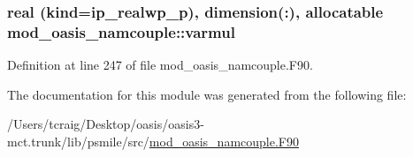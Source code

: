 \hypertarget{classmod__oasis__namcouple_ab7c38fd6bd90bb8e6ebfb539ead1f1a9}{
\subsubsection[{varmul}]{\setlength{\rightskip}{0pt plus 5cm}real (kind=ip\+\_\+realwp\+\_\+p), dimension(\+:), allocatable mod\+\_\+oasis\+\_\+namcouple\+::varmul\hspace{0.3cm}{\ttfamily [private]}}}\label{classmod__oasis__namcouple_ab7c38fd6bd90bb8e6ebfb539ead1f1a9}


Definition at line 247 of file mod\+\_\+oasis\+\_\+namcouple.\+F90.



The documentation for this module was generated from the following file\+:\begin{DoxyCompactItemize}
\item 
/\+Users/tcraig/\+Desktop/oasis/oasis3-\/mct.\+trunk/lib/psmile/src/\hyperlink{mod__oasis__namcouple_8_f90}{mod\+\_\+oasis\+\_\+namcouple.\+F90}\end{DoxyCompactItemize}

